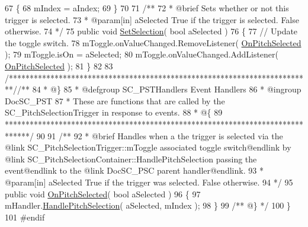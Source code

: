 \begin{DoxyCodeInclude}
67     \{
68         mIndex = aIndex;
69     \}
70 \textcolor{comment}{}
71 \textcolor{comment}{    /**}
72 \textcolor{comment}{     * @brief Sets whether or not this trigger is selected.}
73 \textcolor{comment}{     * @param[in] aSelected True if the trigger is selected. False otherwise.}
74 \textcolor{comment}{    */}
75     \textcolor{keyword}{public} \textcolor{keywordtype}{void} \hyperlink{group___s_c___p_s_t_pub_func_ga267db9aed38ba33ad44c26c84a1757df}{SetSelection}( \textcolor{keywordtype}{bool} aSelected )
76     \{
77         \textcolor{comment}{// Update the toggle switch.}
78         mToggle.onValueChanged.RemoveListener( \hyperlink{group___s_c___p_s_t_handlers_ga5f4ea69eee3ed20cb09d56b7281ce861}{OnPitchSelected} );
79         mToggle.isOn = aSelected;
80         mToggle.onValueChanged.AddListener( \hyperlink{group___s_c___p_s_t_handlers_ga5f4ea69eee3ed20cb09d56b7281ce861}{OnPitchSelected} );
81     \}
82 
83     \textcolor{comment}{/*************************************************************************/}\textcolor{comment}{/** }
84 \textcolor{comment}{    * @\}}
85 \textcolor{comment}{    * @defgroup SC\_PSTHandlers Event Handlers}
86 \textcolor{comment}{    * @ingroup DocSC\_PST}
87 \textcolor{comment}{    * These are functions that are called by the SC\_PitchSelectionTrigger in response to events.}
88 \textcolor{comment}{    * @\{}
89 \textcolor{comment}{    ******************************************************************************/}
90 \textcolor{comment}{}
91 \textcolor{comment}{    /**}
92 \textcolor{comment}{     * @brief Handles when a the trigger is selected via the @link SC\_PitchSelectionTrigger::mToggle
       associated toggle switch@endlink by @link SC\_PitchSelectionContainer::HandlePitchSelection passing the
       event@endlink to the @link DocSC\_PSC parent handler@endlink.}
93 \textcolor{comment}{     * @param[in] aSelected True if the trigger was selected. False otherwise.}
94 \textcolor{comment}{    */}
95     \textcolor{keyword}{public} \textcolor{keywordtype}{void} \hyperlink{group___s_c___p_s_t_handlers_ga5f4ea69eee3ed20cb09d56b7281ce861}{OnPitchSelected}( \textcolor{keywordtype}{bool} aSelected )
96     \{
97         mHandler.\hyperlink{group___s_c___p_s_c_handlers_gaa2afa8167100515d412cf751d9334f0c}{HandlePitchSelection}( aSelected, mIndex );
98     \}\textcolor{comment}{}
99 \textcolor{comment}{    /** @\} */}
100 \}
101 \textcolor{preprocessor}{#endif}
\end{DoxyCodeInclude}
 